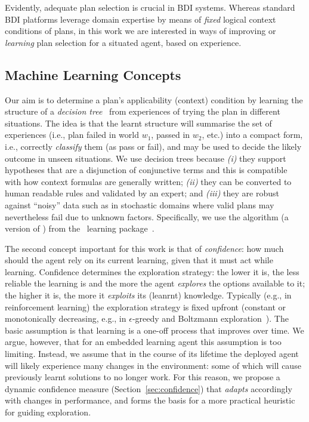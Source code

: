 Evidently, adequate plan selection is crucial in BDI systems. Whereas standard BDI platforms leverage domain expertise by means of \emph{fixed} logical context conditions of plans, in this work we are interested in ways of improving or \emph{learning} plan selection for a situated agent, based on experience.

\subsection{Machine Learning Concepts}

Our aim is to determine a plan's applicability (context) condition by learning the structure of a {\em decision tree}~\cite{Mitchell97:ML} from experiences of trying the plan in different situations. The idea is that the learnt structure will summarise the set of experiences (i.e., plan failed in world $w_1$, passed in $w_2$, etc.) into a compact form, i.e., correctly {\em classify} them (as pass or fail), and may be used to decide the likely outcome in unseen situations.
%
We use decision trees because \emph{(i)} they support hypotheses that are a disjunction of conjunctive terms and this is compatible with how context formulas are generally written; \emph{(ii)} they can be converted to human readable rules and validated by an expert; and \emph{(iii)} they are robust against ``noisy'' data such as in stochastic domains where valid plans may nevertheless fail due to unknown factors. 
%
Specifically, we use the algorithm  (a version of ) from the \weka\ learning package~\cite{weka99}.



The second concept important for this work is that of {\em confidence}: how much should the agent rely on its current learning, given that it must act while learning. Confidence determines the exploration strategy: the lower it is, the less reliable the learning is and the more the agent {\em explores} the options available to it; the higher it is, the more it {\em exploits} its (leanrnt) knowledge. Typically (e.g., in reinforcement learning) the exploration strategy is fixed upfront (constant or monotonically decreasing, e.g., in $\epsilon$-greedy and Boltzmann exploration~\cite{sutton98:reinforcement}). The basic assumption is that learning is a one-off process that improves over time. We argue, however, that for an embedded learning agent this assumption is too limiting. Instead, we assume that in the course of its lifetime the deployed agent will likely experience many changes in the environment: some of which will cause previously learnt solutions to no longer work. For this reason, we propose a dynamic confidence measure (Section~\ref{sec:confidence}) that {\em adapts} accordingly with changes in performance, and forms the basis for a more practical heuristic for guiding exploration.
